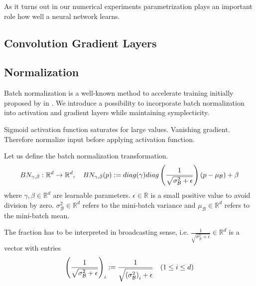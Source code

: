 \documentclass[twoside,a4paper]{article}
\begin{document}
As it turns out in our numerical experiments
parametrization plays an important role how well a neural network learns.

\subsection{Convolution Gradient Layers}



\subsection{Normalization}


Batch normalization is a well-known method to accelerate training initially proposed by
\citeauthor{batchnorm-ioffe15} in \cite{batchnorm-ioffe15}. 
We introduce a possibility to incorporate batch normalization
into activation and gradient layers while maintaining symplecticity.

Sigmoid activation function saturates for large values. Vanishing gradient.
Therefore normalize input before applying activation function.

Let us define the batch normalization transformation.
\begin{equation*}
	BN_{\gamma, \beta} : \mathbb{R}^d \to \mathbb{R}^d,\quad
	BN_{\gamma, \beta}(p) 
	:= diag(\gamma)diag\left( \frac{1}{\sqrt{\sigma^2_\mathcal{B} + \epsilon}} \right) (p-\mu_\mathcal{B}) + \beta
\end{equation*}
where $\gamma, \beta \in \mathbb{R}^{d}$ are learnable parameters.
$\epsilon \in \mathbb{R}$ is a small positive value to avoid division by zero.
$\sigma^2_\mathcal{B} \in \mathbb{R}^{d}$ refers to the mini-batch variance and
$\mu_\mathcal{B} \in \mathbb{R}^{d}$ refers to the mini-batch mean.

The fraction has to be interpreted in broadcasting sense, i.e.
$\frac{1}{\sqrt{\sigma^2_\mathcal{B} + \epsilon}} \in \mathbb{R}^d$ is a vector with entries
\begin{equation*}
	\left( \frac{1}{\sqrt{\sigma^2_\mathcal{B} + \epsilon}} \right)_i
	:= \frac{1}{ \sqrt{ \left( \sigma^2_\mathcal{B} \right)_i + \epsilon}}
	\quad (1 \leq i \leq d)
\end{equation*}
\end{document}
